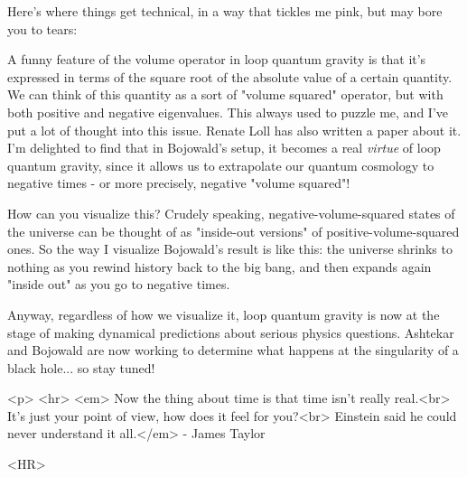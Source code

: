 Here's where things get technical, in a way that tickles me pink, but
may bore you to tears:

A funny feature of the volume operator in loop quantum gravity is that
it's expressed in terms of the square root of the absolute value of a
certain quantity.  We can think of this quantity as a sort of "volume
squared" operator, but with both positive and negative eigenvalues.
This always used to puzzle me, and I've put a lot of thought into this
issue.  Renate Loll has also written a paper about it.  I'm delighted
to find that in Bojowald's setup, it becomes a real \emph{virtue} of loop
quantum gravity, since it allows us to extrapolate our quantum
cosmology to negative times - or more precisely, negative "volume
squared"!

How can you visualize this?  Crudely speaking, negative-volume-squared
states of the universe can be thought of as "inside-out versions" of
positive-volume-squared ones.  So the way I visualize Bojowald's
result is like this: the universe shrinks to nothing as you rewind
history back to the big bang, and then expands again "inside out" as
you go to negative times.

Anyway, regardless of how we visualize it, loop quantum gravity
is now at the stage of making dynamical predictions about serious
physics questions.  Ashtekar and Bojowald are now working to determine
what happens at the singularity of a black hole... so stay tuned!



<p> <hr>
<em>
Now the thing about time is that time isn't really real.<br>
It's just your point of view, how does it feel for you?<br>
Einstein said he could never understand it all.</em> - James Taylor


<HR>



